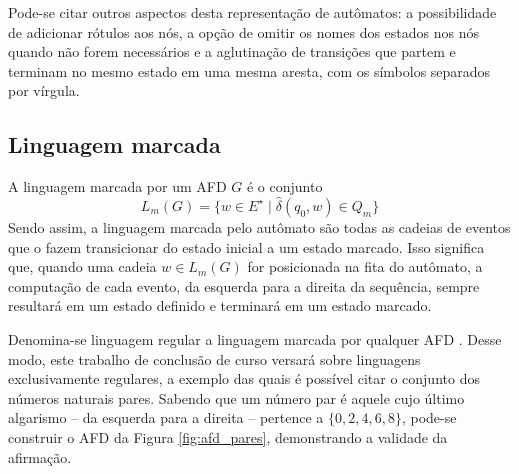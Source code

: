 
Pode-se citar outros aspectos desta representação de autômatos: a possibilidade de adicionar rótulos aos nós, a opção de omitir os nomes dos estados nos nós quando não forem necessários e a aglutinação de transições que partem e terminam no mesmo estado em uma mesma aresta, com os símbolos separados por vírgula.

\subsection{Linguagem marcada}

A linguagem marcada por um AFD $G$ é o conjunto $$L_m(G) = \{ w \in E^\star \mid \hat{\delta}(q_0, w) \in Q_m \}$$ Sendo assim, a linguagem marcada pelo autômato são todas as cadeias de eventos que o fazem transicionar do estado inicial a um estado marcado. Isso significa que, quando uma cadeia $w \in L_m(G)$ for posicionada na fita do autômato, a computação de cada evento, da esquerda para a direita da sequência, sempre resultará em um estado definido e terminará em um estado marcado.

Denomina-se linguagem regular a linguagem marcada por qualquer AFD \cite{hopcroft}. Desse modo, este trabalho de conclusão de curso versará sobre linguagens exclusivamente regulares, a exemplo das quais é possível citar o conjunto dos números naturais pares. Sabendo que um número par é aquele cujo último algarismo -- da esquerda para a direita -- pertence a $\{ 0, 2, 4, 6, 8 \}$, pode-se construir o AFD da Figura \ref{fig:afd_pares}, demonstrando a validade da afirmação.


